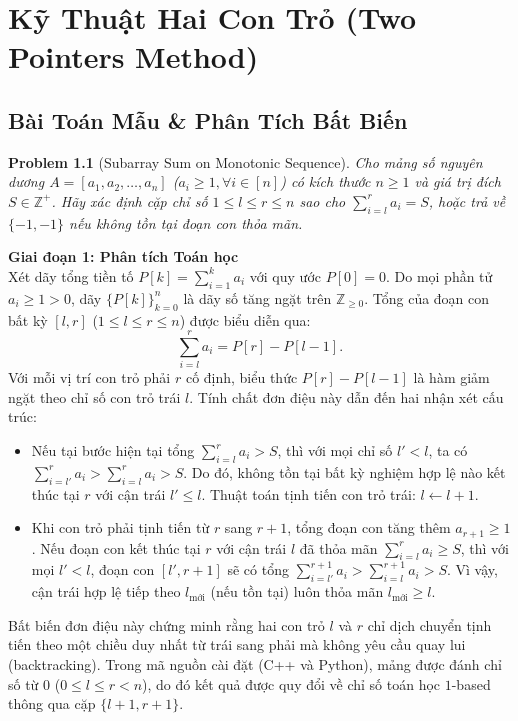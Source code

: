 \documentclass[11pt, letterpaper]{report}
\newtheorem{baitoan}{Problem}[chapter]
\begin{document}
\chapter{Kỹ Thuật Hai Con Trỏ (Two Pointers Method)}
\label{mod:two_pointers}

\section{Bài Toán Mẫu \& Phân Tích Bất Biến}
\begin{baitoan}[Subarray Sum on Monotonic Sequence]
Cho mảng số nguyên dương $A = [a_1, a_2, \dots, a_n]$ ($a_i \ge 1, \forall i \in [n]$) có kích thước $n \ge 1$ và giá trị đích $S \in \mathbb{Z}^+$. Hãy xác định cặp chỉ số $1 \le l \le r \le n$ sao cho $\sum_{i=l}^r a_i = S$, hoặc trả về $\{-1, -1\}$ nếu không tồn tại đoạn con thỏa mãn.
\end{baitoan}

\noindent\textbf{Giai đoạn 1: Phân tích Toán học}\\
Xét dãy tổng tiền tố $P[k] = \sum_{i=1}^k a_i$ với quy ước $P[0] = 0$. Do mọi phần tử $a_i \ge 1 > 0$, dãy $\{P[k]\}_{k=0}^n$ là dãy số tăng ngặt trên $\mathbb{Z}_{\ge 0}$. Tổng của đoạn con bất kỳ $[l, r]$ ($1 \le l \le r \le n$) được biểu diễn qua:
\begin{equation}
\sum_{i=l}^r a_i = P[r] - P[l-1].
\end{equation}
Với mỗi vị trí con trỏ phải $r$ cố định, biểu thức $P[r] - P[l-1]$ là hàm giảm ngặt theo chỉ số con trỏ trái $l$. Tính chất đơn điệu này dẫn đến hai nhận xét cấu trúc:
\begin{itemize}
 \item Nếu tại bước hiện tại tổng $\sum_{i=l}^r a_i > S$, thì với mọi chỉ số $l' < l$, ta có $\sum_{i=l'}^r a_i > \sum_{i=l}^r a_i > S$. Do đó, không tồn tại bất kỳ nghiệm hợp lệ nào kết thúc tại $r$ với cận trái $l' \le l$. Thuật toán tịnh tiến con trỏ trái: $l \gets l + 1$.
 \item Khi con trỏ phải tịnh tiến từ $r$ sang $r+1$, tổng đoạn con tăng thêm $a_{r+1} \ge 1$. Nếu đoạn con kết thúc tại $r$ với cận trái $l$ đã thỏa mãn $\sum_{i=l}^r a_i \ge S$, thì với mọi $l' < l$, đoạn con $[l', r+1]$ sẽ có tổng $\sum_{i=l'}^{r+1} a_i > \sum_{i=l}^{r+1} a_i > S$. Vì vậy, cận trái hợp lệ tiếp theo $l_{\text{mới}}$ (nếu tồn tại) luôn thỏa mãn $l_{\text{mới}} \ge l$.
\end{itemize}
Bất biến đơn điệu này chứng minh rằng hai con trỏ $l$ và $r$ chỉ dịch chuyển tịnh tiến theo một chiều duy nhất từ trái sang phải mà không yêu cầu quay lui (backtracking). Trong mã nguồn cài đặt (C++ và Python), mảng được đánh chỉ số từ $0$ ($0 \le l \le r < n$), do đó kết quả được quy đổi về chỉ số toán học $1$-based thông qua cặp $\{l+1, r+1\}$.
\end{document}
